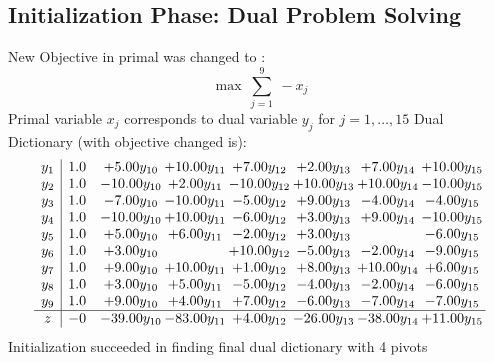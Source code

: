\documentclass[9pt]{article}
\begin{document}
\subsection{Initialization Phase: Dual Problem Solving}
New Objective in primal was changed to : \[ \max\ \sum_{j=1}^{9}\ - x_j \] 
Primal variable $x_j$ corresponds to dual variable $y_j$ for $j = 1,\ldots,15$
Dual Dictionary (with objective changed is): 
\[\begin{array}{c| c c@{\hskip 2pt} c@{\hskip 2pt} c@{\hskip 2pt} c@{\hskip 2pt} c@{\hskip 2pt} c@{\hskip 2pt} }
 y_{1}   &  1.0 & +  5.00 y_{10} & + 10.00 y_{11} & +  7.00 y_{12} & +  2.00 y_{13} & +  7.00 y_{14} & + 10.00 y_{15}\\
 y_{2}   &  1.0 & -10.00 y_{10} & +  2.00 y_{11} & -10.00 y_{12} & + 10.00 y_{13} & + 10.00 y_{14} & -10.00 y_{15}\\
 y_{3}   &  1.0 & -7.00 y_{10} & -10.00 y_{11} & -5.00 y_{12} & +  9.00 y_{13} & -4.00 y_{14} & -4.00 y_{15}\\
 y_{4}   &  1.0 & -10.00 y_{10} & + 10.00 y_{11} & -6.00 y_{12} & +  3.00 y_{13} & +  9.00 y_{14} & -10.00 y_{15}\\
 y_{5}   &  1.0 & +  5.00 y_{10} & +  6.00 y_{11} & -2.00 y_{12} & +  3.00 y_{13} &   & -6.00 y_{15}\\
 y_{6}   &  1.0 & +  3.00 y_{10} &   & + 10.00 y_{12} & -5.00 y_{13} & -2.00 y_{14} & -9.00 y_{15}\\
 y_{7}   &  1.0 & +  9.00 y_{10} & + 10.00 y_{11} & +  1.00 y_{12} & +  8.00 y_{13} & + 10.00 y_{14} & +  6.00 y_{15}\\
 y_{8}   &  1.0 & +  3.00 y_{10} & +  5.00 y_{11} & -5.00 y_{12} & -4.00 y_{13} & -2.00 y_{14} & -6.00 y_{15}\\
 y_{9}   &  1.0 & +  9.00 y_{10} & +  4.00 y_{11} & +  7.00 y_{12} & -6.00 y_{13} & -7.00 y_{14} & -7.00 y_{15}\\
\hline
z    &  -0 & -39.00 y_{10} & -83.00 y_{11} & +  4.00 y_{12} & -26.00 y_{13} & -38.00 y_{14} & + 11.00 y_{15}\\
\end{array}\]
Initialization succeeded in finding final dual dictionary with 4 pivots
\end{document}
